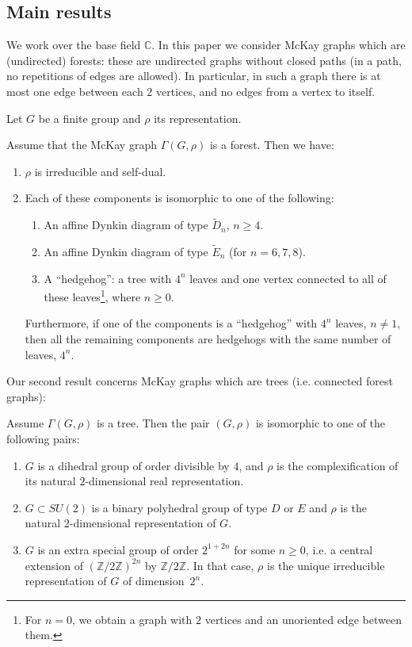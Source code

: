 \documentclass[ALCO]{cedram}
\newcommand{\C}{{\mathbb C}}
\newcommand{\Z}{{\mathbb Z}}
\begin{document}
\subsection{Main results}

We work over the base field $\C$. In this paper we consider McKay graphs which are \textup{(}undirected\textup{)} forests: these are undirected graphs without closed paths \textup{(}in a path, no repetitions of edges are allowed\textup{)}. In particular, in such a graph there is at most one edge between each $2$ vertices, and no edges from a vertex to itself.
\begin{introtheorem}\label{introthm:forests}
Let $G$ be a finite group and $\rho$ its representation.

Assume that the McKay graph $\Gamma(G,\rho)$ is a forest. Then we have: 
    \begin{enumerate}
        \item $\rho$ is irreducible and self-dual.
        \item Each of these components  is isomorphic to one of the following:
\begin{enumerate}
    \item An affine Dynkin diagram of type $\tilde{D}_{n}$, $n\geq 4$.
\item An affine Dynkin diagram of type $\tilde{E}_n$ \textup{(}for $n=6,7,8$\textup{)}.
\item  A ``hedgehog'': a tree with $4^n$ leaves and one vertex connected to all of these leaves\footnote{For $n=0$, we obtain a graph with $2$ vertices and an unoriented edge between them.}, where $n\geq 0$.
\end{enumerate}
Furthermore, if one of the components is a ``hedgehog'' with $4^n$ leaves, $n\neq 1$, then all the remaining components are hedgehogs with the same number of leaves, $4^n$.
\end{enumerate}
\end{introtheorem}
Our second result concerns McKay graphs which are trees (i.e. connected forest graphs):
\begin{introtheorem}\label{introthm:trees}
Assume $\Gamma(G,\rho)$ is a tree. Then the pair $(G,\rho)$ is isomorphic to one of the following pairs: 
\begin{enumerate}
    \item $G$ is a dihedral group of order divisible by $4$, and $\rho$ is the complexification of its natural $2$-dimensional real representation.
    
\item $G \subset SU(2)$ is a binary polyhedral group of type $D$ or $E$ and $\rho$ is the natural $2$-dimensional representation of $G$.

\item $G$ is an extra special group of order $2^{1+2n}$ for some $n\geq 0$, i.e. a central extension of $(\Z/2\Z)^{2n}$ by $\Z/2\Z$. In that case, $\rho$ is the unique irreducible representation of $G$ of dimension~$2^n$.
\end{enumerate} 
\end{introtheorem}
\end{document}
